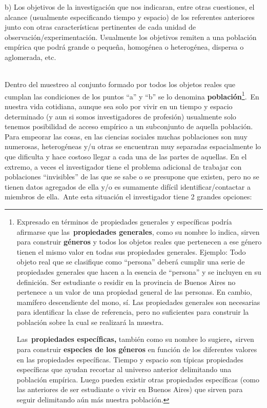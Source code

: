 \documentclass[
  spanish,
  a4paper,
]{scrreprt}
\begin{document}
b) Los objetivos de la investigación que nos indicaran, entre otras
cuestiones, el alcance (usualmente especificando tiempo y espacio) de
los referentes anteriores junto con otras características pertinentes de
cada unidad de observación/experimentación. Usualmente los objetivos
remiten a una población empírica que podrá grande o pequeña, homogénea o
heterogénea, dispersa o aglomerada, etc.~\\
\strut \\
Dentro del muestreo al conjunto formado por todos los objetos reales que
cumplan las condiciones de los puntos ``a'' y ``b'' se lo denomina
\textbf{población}\footnote{Expresado en términos de propiedades
  generales y específicas podría afirmarse que las~\textbf{propiedades
  generales}, como su nombre lo indica, sirven para construir
  \textbf{géneros} y todos los objetos reales que pertenecen a ese
  género tienen el mismo valor en todas sus propiedades generales.
  Ejemplo: Todo objeto real que se clasifique como ``persona'' deberá
  cumplir una serie de propiedades generales que hacen a la esencia de
  ``persona'' y se incluyen en su definición. Ser estudiante o residir
  en la provincia de Buenos Aires no pertenece a un valor de una
  propiedad general de las personas. En cambio, mamífero descendiente
  del mono, sí. Las propiedades generales son necesarias para
  identificar la clase de referencia, pero no suficientes para construir
  la población sobre la cual se realizará la muestra.~

  Las~\textbf{propiedades específicas,} también como su nombre lo
  sugiere\textbf{,}~sirven para construir \textbf{especies de los
  géneros} en función de los diferentes valores en las propiedades
  específicas. Tiempo y espacio son típicas propiedades específicas que
  ayudan recortar al universo anterior delimitando una población
  empírica. Luego pueden existir otras propiedades específicas (como las
  anteriores de ser estudiante o vivir en Buenos Aires) que sirven para
  seguir delimitando aún más nuestra población.}.~En nuestra vida
cotidiana, aunque sea solo por vivir en un tiempo y espacio determinado
(y aun si somos investigadores de profesión) usualmente solo tenemos
posibilidad de acceso empírico a un subconjunto de aquella población.
Para empeorar las cosas, en las ciencias sociales muchas poblaciones son
muy numerosas, heterogéneas y/u otras se encuentran muy separadas
espacialmente lo que dificulta y hace costoso llegar a cada una de las
partes de aquellas. En el extremo, a veces el investigador tiene el
problema adicional de trabajar con poblaciones ``invisibles'' de las que
se sabe o se presupone que existen, pero no se tienen datos agregados de
ella y/o es sumamente difícil identificar/contactar a miembros de
ella.~Ante esta situación el investigador tiene 2 grandes opciones:
\end{document}
